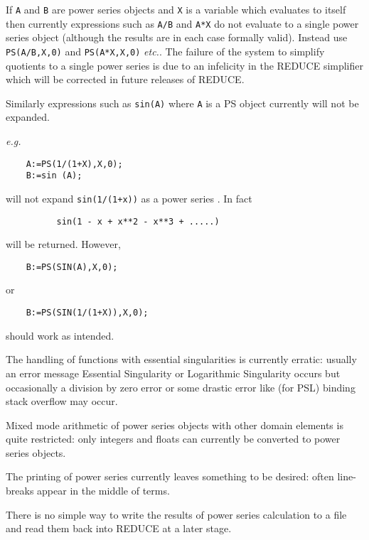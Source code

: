 If {\tt A} and {\tt B} are power series objects and {\tt X} is a variable
which evaluates to itself then currently expressions such as {\tt A/B} and
{\tt A*X} do not evaluate to a single power series object (although the
results are in each case formally valid).  Instead use {\tt PS(A/B,X,0)}
and {\tt PS(A*X,X,0)} {\em etc.}.  The failure of the system to simplify
quotients to a single power series is due to an infelicity in the REDUCE
simplifier which will be corrected in future releases of REDUCE.

Similarly expressions such as {\tt sin(A)} where {\tt A} is a PS object
currently will not be expanded.
 
{\em e.g.}
\begin{verbatim}
    A:=PS(1/(1+X),X,0);
    B:=sin (A); 
\end{verbatim}
will not expand {\tt sin(1/(1+x))} as a power series . In fact
\begin{verbatim}
          sin(1 - x + x**2 - x**3 + .....)
\end{verbatim}
will be returned. However,
\begin{verbatim} 
    B:=PS(SIN(A),X,0);
\end{verbatim}
or
\begin{verbatim} 
    B:=PS(SIN(1/(1+X)),X,0);
\end{verbatim}
should work as intended.

The handling of functions with essential singularities is currently
erratic: usually an error message Essential Singularity or Logarithmic
Singularity occurs but occasionally a division by zero error or some
drastic error like (for PSL) binding stack overflow may occur.
 
Mixed mode arithmetic of power series objects with other domain
elements is quite restricted: only integers and floats can currently
be converted to power series objects.
 
The printing of power series currently leaves something to be
desired: often line-breaks appear in the middle of terms.

There is no simple way to write the results of power series
calculation to a file and read them back into REDUCE at a later
stage.



